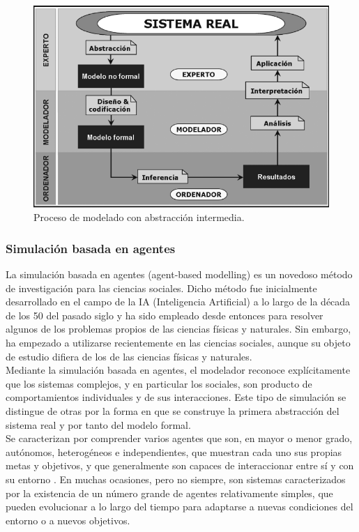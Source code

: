 \begin{figure}[!h]
	\centering
	\includegraphics[scale=0.5]{Images/esquema_modelado_cientifico_con_abstraccion.png}
	\caption{Proceso de modelado con abstracción intermedia. \parencite{izquierdo2008modelado}}
	\label{fig:img_2}
\end{figure}

\subsubsection{Simulación basada en agentes}

La simulación basada en agentes (agent-based modelling) es un novedoso método de investigación para las ciencias sociales. Dicho método fue inicialmente desarrollado en el campo de la IA (Inteligencia Artificial) a lo largo de la década de los 50 del pasado siglo y ha sido empleado desde entonces para resolver algunos de los problemas propios de las ciencias físicas y naturales. Sin embargo, ha empezado a utilizarse recientemente en las ciencias sociales, aunque su objeto de estudio difiera de los de las ciencias físicas y naturales. \parencite{garcia2016simulacion}\\

Mediante la simulación basada en agentes, el modelador reconoce explícitamente que los sistemas complejos, y en particular los sociales, son producto de comportamientos individuales y de sus interacciones. \parencite{izquierdo2008modelado}
Este tipo de simulación se distingue de otras por la forma en que se construye la primera abstracción del sistema real y por tanto del modelo formal.\\

Se caracterizan por comprender varios agentes que son, en mayor o menor grado, autónomos, heterogéneos e independientes, que muestran cada uno sus propias metas y objetivos, y que generalmente son capaces de interaccionar entre sí y con su entorno \parencite{torsun1995foundations}. En muchas ocasiones, pero no siempre, son sistemas caracterizados por la existencia de un número grande de agentes relativamente simples, que pueden evolucionar a lo largo del tiempo para adaptarse a nuevas condiciones del entorno o a nuevos objetivos. \parencite{izquierdo2008modelado}

